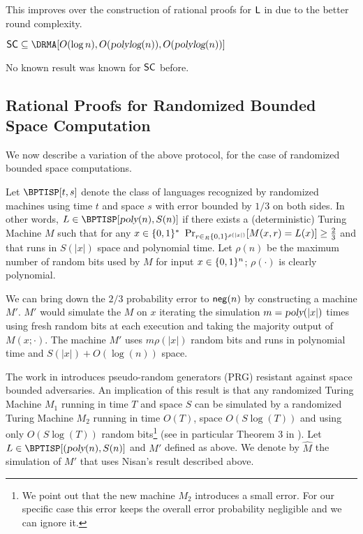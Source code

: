 This improves over the construction of rational proofs for ${\mathsf{L}}$ in \cite{ratsumchecks} due to the better round complexity. 

\begin{corollary}
	\label{cor:SC}
$ \SC \subseteq \DRMA[O(\log n), O(\polylog(n)), O(\polylog(n))]$
\end{corollary}

No known result was known for ${\mathsf{SC}}$ before. 


\subsection{Rational Proofs for Randomized Bounded Space  Computation}
\label{sec:rand-space}

We now describe a variation of the above protocol, for the case of randomized bounded space computations. 

Let $\BPTISP[t,s]$ denote the class of languages recognized by randomized machines using time $t$ and space $s$ with error bounded by $1/3$ on both sides. 
In other words, $L \in \BPTISP[\poly(n), S(n)]$ if there exists a (deterministic) Turing Machine $M$ such that
for any $x \in \{0, 1\}^{*}$ $\Pr_{r \in_R \{0, 1\}^{\rho(|x|)}}[M(x, r) = L(x)] \geq \frac{2}{3}$ and that runs in $S(|x|)$ space and polynomial time.
Let $\rho(n)$ be the maximum number of random bits used by $M$ for input $x \in \{0, 1\}^n$; $\rho(\cdot)$ is clearly polynomial.

We can bring down the $2/3$ probability error to $\mathsf{neg}(n)$
by constructing a machine $M'$. $M'$ would simulate the $M$ on $x$ iterating the simulation $m = {\textsl{poly}}(|x|)$ times
using fresh random bits at each execution and taking the majority output of $M(x;\cdot)$.
The machine $M'$ uses $m\rho(|x|)$ random bits and runs in polynomial time and $S(|x|) + O(\log(n))$ space.

The work in \cite{nisan1992pseudorandom} introduces pseudo-random generators (PRG) resistant against space bounded adversaries.
An implication of this result is that any randomized Turing Machine $M_1$ running in time $T$ and space $S$ can be simulated by a
 randomized Turing Machine $M_2$ running in time $O(T)$, space $O(S \log(T))$ and using only $O(S \log(T))$ random bits\footnote{We point out that the new machine $M_2$ introduces a small error. For our specific case this error keeps the overall error probability negligible and we can ignore it.}
(see in particular Theorem 3 in \cite{nisan1992pseudorandom}).
Let $L \in  \BPTISP[(\poly(n), S(n)]$ and $M'$ defined as above. We denote by $\hat{M}$ the simulation of $M'$ that uses Nisan's result described above.

